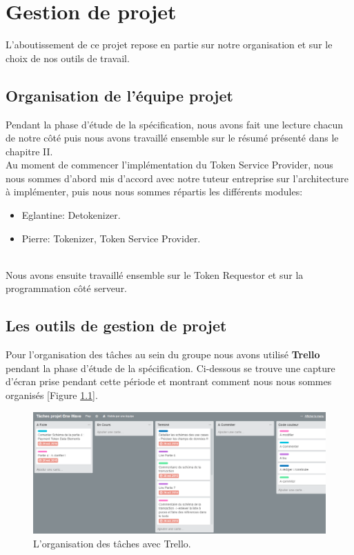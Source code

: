 \documentclass{report}
\begin{document}
\chapter{Gestion de projet}
L'aboutissement de ce projet repose en partie sur notre organisation et sur le choix de nos outils de travail. 

\section{Organisation de l'équipe projet}
Pendant la phase d'étude de la spécification, nous avons fait une lecture chacun de notre côté puis nous avons travaillé ensemble sur le résumé présenté dans le chapitre II.\\
Au moment de commencer l'implémentation du Token Service Provider, nous nous sommes d'abord mis d'accord avec notre tuteur entreprise sur l'architecture à implémenter, puis nous nous sommes répartis les différents modules:\\

\begin{itemize}
	\item Eglantine: Detokenizer.
	\item Pierre: Tokenizer, Token Service Provider.
\end{itemize}

~\\
\noindent
Nous avons ensuite travaillé ensemble sur le Token Requestor et sur la programmation côté serveur.

\section{Les outils de gestion de projet}
Pour l'organisation des tâches au sein du groupe nous avons utilisé \textbf{Trello} pendant la phase d'étude de la spécification. Ci-dessous se trouve une capture d'écran prise pendant cette période et montrant comment nous nous sommes organisés [Figure \ref{Trello}]. 

\begin{figure}[!ht]
    \centering
			\includegraphics[scale=0.46]{img/trello.PNG}
			\caption{\label{Trello} L'organisation des tâches avec Trello.}			
\end{figure}
\end{document}
